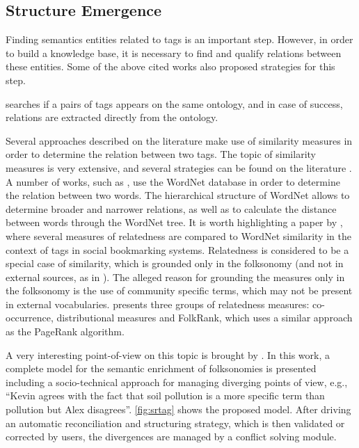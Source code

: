 
\subsection{Structure Emergence}
\label{sec:emergence}

Finding semantics entities related to tags is an important step.
However, in order to build a knowledge base, it is necessary to find and qualify relations between these entities.
Some of the above cited works also proposed strategies for this step.

 searches if a pairs of tags appears on the same ontology, and in case of success, relations are extracted directly from the ontology.

Several approaches described on the literature make use of similarity measures in order to determine the relation between two tags.
The topic of similarity measures is very extensive, and several strategies can be found on the literature \cite{Harispe2015, Harispe2014, Trillo2007, Cilibrasi2007}.
A number of works, such as \cite{Limpens2013}, use the WordNet database in order to determine the relation between two words.
The hierarchical structure of WordNet allows to determine broader and narrower relations, as well as to calculate the distance between words through the WordNet tree.
It is worth highlighting a paper by , where several measures of relatedness are compared to WordNet similarity in the context of tags in social bookmarking systems.
Relatedness is considered to be a special case of similarity, which is grounded only in the folksonomy (and not in external sources, as in ).
The alleged reason for grounding the measures only in the folksonomy is the use of community specific terms, which may not be present in external vocabularies.
 presents three groups of relatedness measures: co-occurrence, distributional measures and FolkRank, which uses a similar approach as the PageRank algorithm.

A very interesting point-of-view on this topic is brought by .
In this work, a complete model for the semantic enrichment of folksonomies is presented including a socio-technical approach for managing diverging points of view, e.g., ``Kevin agrees with the fact that soil pollution is a more specific term than pollution but Alex disagrees''.
\autoref{fig:srtag} shows the proposed model.
After driving an automatic reconciliation and structuring strategy, which is then validated or corrected by users, the divergences are managed by a conflict solving module.

